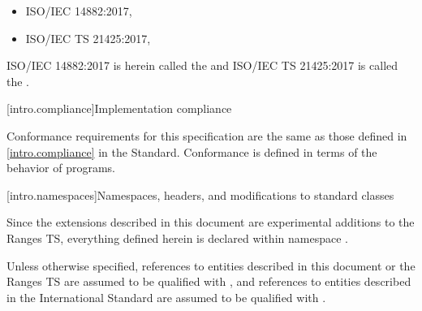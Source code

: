 \begin{itemize}
\item ISO/IEC 14882:2017, 
\item ISO/IEC TS 21425:2017, 
\end{itemize}

ISO/IEC 14882:2017 is herein called the \defn{C\Rplus\Rplus\xspace Standard} and
ISO/IEC TS 21425:2017 is called the .

[intro.compliance]{Implementation compliance}

\pnum
Conformance requirements for this specification are the same as those
defined in \ref{intro.compliance} in the \Cpp Standard.
\enternote
Conformance is defined in terms of the behavior of programs.
\exitnote

\begin{removedblock}
[intro.namespaces]{Namespaces, headers, and modifications to standard classes}

\pnum
Since the extensions described in this document are experimental additions to the Ranges TS,
everything defined herein is declared within namespace .

\pnum
Unless otherwise specified, references to entities described in this
document or the Ranges TS are assumed to be qualified with , and
references to entities described in the International Standard are assumed to be
qualified with .
\end{removedblock}